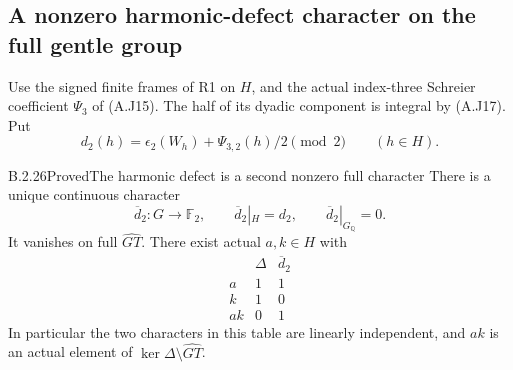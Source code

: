 \subsection{A nonzero harmonic-defect character on the full gentle group}

Use the signed finite frames of R1 on $H$, and the actual
index-three Schreier coefficient $\Psi_3$ of (A.J15).
The half of its dyadic component is integral by (A.J17).
Put
\[
 d_2(h)=\epsilon_2(W_h)+\Psi_{3,2}(h)/2\pmod2
                      \qquad(h\in H).
 \tag{B.Y1}
\]

\begin{result}{B.2.26}{Proved}{The harmonic defect is a second nonzero full character}
There is a unique continuous character
\[
 \overline d_2:G\longrightarrow\mathbb F_2,
 \qquad\overline d_2|_H=d_2,
 \qquad\overline d_2|_{G_{\mathbb Q}}=0.
 \tag{B.Y2}
\]
It vanishes on full $\widehat{GT}$.  There exist actual
$a,k\in H$ with
\[
 \begin{array}{c|cc}
       &\Delta&\overline d_2\\\hline
 a     &1&1\\
 k     &1&0\\
 ak    &0&1
 \end{array}
 \tag{B.Y3}
\]
In particular the two characters in this table are
linearly independent, and $ak$ is an actual element of
$\ker\Delta\setminus\widehat{GT}$.
\end{result}
